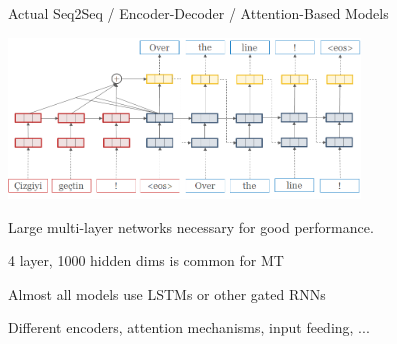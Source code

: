\documentclass{beamer}
\let\tempone\itemize
\let\temptwo\enditemize
\renewenvironment{itemize}{\tempone\addtolength{\itemsep}{0.5\baselineskip}}{\temptwo}
\newcommand{\air}{\vspace{0.25cm}}
\newcommand{\cvec}{\mathbf{c}}
\begin{document}
\begin{frame}
  \begin{center}
    Actual Seq2Seq / Encoder-Decoder / Attention-Based Models
  \end{center}
    \begin{center}
      \includegraphics[width=0.7\textwidth]{simple-attn}
    \end{center}
  \begin{itemize}
  \item Large multi-layer networks  necessary for good performance.
    \begin{itemize}
    \item 4 layer, 1000 hidden dims is common for MT
      \air
      \pause 

  \item Almost all models use LSTMs or other gated RNNs 
    \pause 

    \air
  \item Different encoders, attention mechanisms, input feeding, ...
    \end{itemize}
  \end{itemize}
\end{frame}


\end{document}
